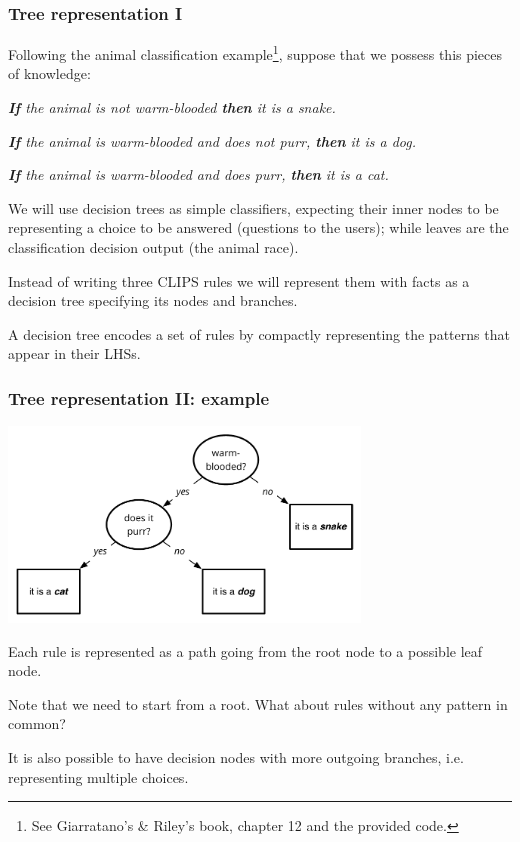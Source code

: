 \documentclass[xcolor={usenames,dvipsnames,svgnames}, compress]{beamer}
\begin{document}
\begin{frame}
  \frametitle{Tree representation I}
  
  Following the animal classification example\footnote{See
    Giarratano's \& Riley's book, chapter 12 and the provided code.},
  suppose that we possess this pieces of knowledge:\par\bigskip
  \emph{\textbf{If} the animal is not warm-blooded \textbf{then} it is a snake.}\par
  \emph{\textbf{If} the animal is warm-blooded and does not purr, \textbf{then} it is a dog.}\par
  \emph{\textbf{If} the animal is warm-blooded and does purr, \textbf{then} it is a cat.}\par\bigskip

  We will use decision trees as simple classifiers, expecting their
  inner nodes to be representing a choice to be answered (questions to
  the users); while leaves are the classification decision
  output (the animal race).\par\bigskip

  Instead of writing three CLIPS rules we will represent them with
  facts as a decision tree specifying its nodes and branches.\par
  A decision tree encodes a set of rules by compactly representing the
  patterns that appear in their LHSs.
  
\end{frame}

\begin{frame}
  \frametitle{Tree representation II: example}
  \begin{center}
    \includegraphics[width=0.7\textwidth]{Figures/dectree-1}
  \end{center}
  Each rule is represented as a path going from the root node to a
  possible leaf node.\par
  Note that we need to start from a root. What about rules without
  any pattern in common?\par\bigskip
  
  It is also possible to have decision nodes with more outgoing
  branches, i.e. representing multiple choices.
\end{frame}
\end{document}
